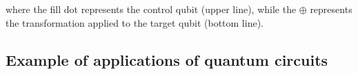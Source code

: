 \noindent where the fill dot represents the control qubit (upper line), while the $ \oplus$ represents the transformation applied to the target qubit (bottom line). 




%
%
%


 \subsection{Example of applications of quantum circuits}  %


